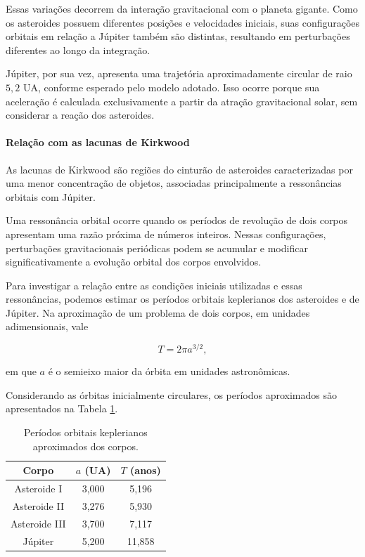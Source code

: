 \documentclass[12pt,a4paper]{article}
\begin{document}
Essas variações decorrem da interação gravitacional com o planeta gigante. Como os asteroides possuem diferentes posições e velocidades iniciais, suas configurações orbitais em relação a Júpiter também são distintas, resultando em perturbações diferentes ao longo da integração.

Júpiter, por sua vez, apresenta uma trajetória aproximadamente circular de raio $5,2$ UA, conforme esperado pelo modelo adotado. Isso ocorre porque sua aceleração é calculada exclusivamente a partir da atração gravitacional solar, sem considerar a reação dos asteroides.

\paragraph{Relação com as lacunas de Kirkwood}

As lacunas de Kirkwood são regiões do cinturão de asteroides caracterizadas por uma menor concentração de objetos, associadas principalmente a ressonâncias orbitais com Júpiter.

Uma ressonância orbital ocorre quando os períodos de revolução de dois corpos apresentam uma razão próxima de números inteiros. Nessas configurações, perturbações gravitacionais periódicas podem se acumular e modificar significativamente a evolução orbital dos corpos envolvidos.

Para investigar a relação entre as condições iniciais utilizadas e essas ressonâncias, podemos estimar os períodos orbitais keplerianos dos asteroides e de Júpiter. Na aproximação de um problema de dois corpos, em unidades adimensionais, vale

\begin{equation}
    T=2\pi a^{3/2},
\end{equation}

em que $a$ é o semieixo maior da órbita em unidades astronômicas.

Considerando as órbitas inicialmente circulares, os períodos aproximados são apresentados na Tabela \ref{tab:periodos-asteroides}.

\begin{table}[htbp]
    \centering
    \caption{Períodos orbitais keplerianos aproximados dos corpos.}
    \label{tab:periodos-asteroides}
    \begin{tabular}{c|c|c}
        \hline
        Corpo & $a$ (UA) & $T$ (anos) \\
        \hline
        Asteroide I & 3,000 & 5,196 \\
        Asteroide II & 3,276 & 5,930 \\
        Asteroide III & 3,700 & 7,117 \\
        Júpiter & 5,200 & 11,858 \\
        \hline
    \end{tabular}
\end{table}
\end{document}
